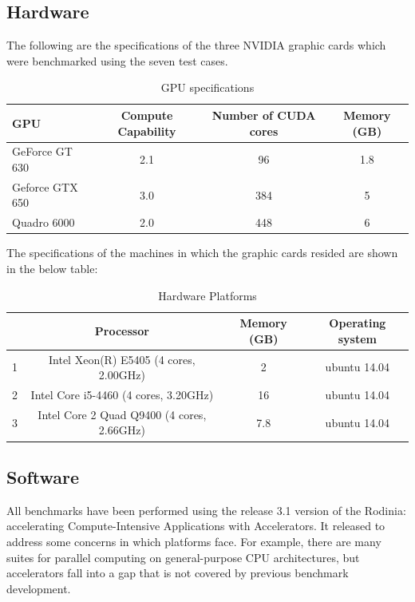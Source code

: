 \documentclass[paper=a4, fontsize=11pt]{scrartcl}
\numberwithin{equation}{section}		%
\numberwithin{figure}{section}			%
\numberwithin{table}{section}				%
\begin{document}
\subsection{Hardware}
The following are the specifications of the three NVIDIA graphic cards which were benchmarked using the seven test cases.

\begin{table}[!h]
\caption{GPU specifications}
\centering
\begin{tabular}{|l| c| c| c|}
	\hline
	GPU & Compute Capability & Number of CUDA cores & Memory (GB)\\
	\hline
    GeForce GT 630 & 2.1 & 96 & 1.8  \\
	\hline
    Geforce GTX 650 & 3.0 & 384 & 5 \\
	\hline
    Quadro 6000 & 2.0 & 448 & 6 \\
	\hline
\end{tabular}
\label{table1}
\end{table}

The specifications of the machines in which the graphic cards resided are shown in the below table:

\begin{table}[!h]
\caption{Hardware Platforms}
\centering
\begin{tabular}{| c| c| c| c|}
	\hline
	  & Processor & Memory (GB)& Operating system\\
	\hline
    1  & Intel Xeon(R) E5405 (4 cores, 2.00GHz) & 2& ubuntu 14.04 \\
	\hline
    2  & Intel Core i5-4460 (4 cores, 3.20GHz) & 16 & ubuntu 14.04 \\
	\hline
    3  & Intel Core 2 Quad Q9400 (4 cores, 2.66GHz) & 7.8& ubuntu 14.04 \\
	\hline
\end{tabular}
\label{table2}
\end{table}

\subsection{Software}
All benchmarks have been performed using the release 3.1 version of the Rodinia: accelerating Compute-Intensive Applications with Accelerators. It released to address some concerns in  which platforms face. For example, there are many suites for parallel computing on general-purpose CPU architectures, but accelerators fall into a gap that is not covered by previous benchmark development.
\end{document}
